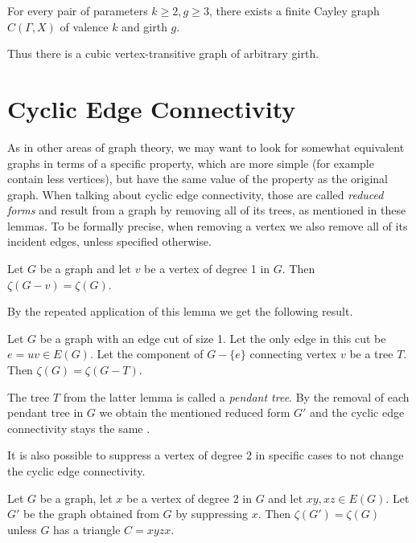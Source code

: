 \documentclass[12pt, twoside]{book}
\begin{document}
\begin{theorem}\label{th:cayley-girth-valence}
	For every pair of parameters $k \geq 2, g \geq 3$, there exists a finite Cayley graph $C(\Gamma, X)$ of valence $k$ and girth $g$.
\end{theorem}

Thus there is a cubic vertex-transitive graph of arbitrary girth.

\chapter{Cyclic Edge Connectivity}\label{ch:cyclic-edge-connectivity}

As in other areas of graph theory, we may want to look for somewhat equivalent graphs in terms of a specific property, which are more simple (for example contain less vertices), but have the same value of the property as the original graph. When talking about cyclic edge connectivity, those are called \textit{reduced forms} and result from a graph by removing all of its trees, as mentioned in these lemmas. To be formally precise, when removing a vertex we also remove all of its incident edges, unless specified otherwise.

\begin{lemma}
	Let $G$ be a graph and let $v$ be a vertex of degree 1 in $G$. Then $\zeta(G-v)=\zeta(G)$.
\end{lemma}

By the repeated application of this lemma we get the following result.

\begin{lemma}
	Let $G$ be a graph with an edge cut of size 1. Let the only edge in this cut be $e=uv\in E(G)$. Let the component of $G-\{e\}$ connecting vertex $v$ be a tree $T$. Then $\zeta(G)=\zeta(G-T)$.
\end{lemma}

The tree $T$ from the latter lemma is called a \textit{pendant tree}. By the removal of each pendant tree in $G$ we obtain the mentioned reduced form $G'$ and the cyclic edge connectivity stays the same \cite{Lou2008}.

It is also possible to suppress a vertex of degree 2 in specific cases to not change the cyclic edge connectivity.

\begin{lemma}
	Let $G$ be a graph, let $x$ be a vertex of degree 2 in $G$ and let $xy, xz\in E(G)$. Let $G'$ be the graph obtained from $G$ by suppressing $x$. Then $\zeta(G')=\zeta(G)$ unless $G$ has a triangle $C=xyzx$. 
\end{lemma}
\end{document}
